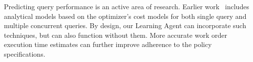 Predicting query performance is an active area of research. 
Earlier work~\cite{wu2013towards, wu2014uncertainty, duggan2011performance} includes analytical models based on the optimizer's cost models for both single query and multiple concurrent queries.
By design, our Learning Agent can incorporate such techniques, but can also function without them. 
More accurate work order execution time estimates can further improve adherence to the policy specifications.


